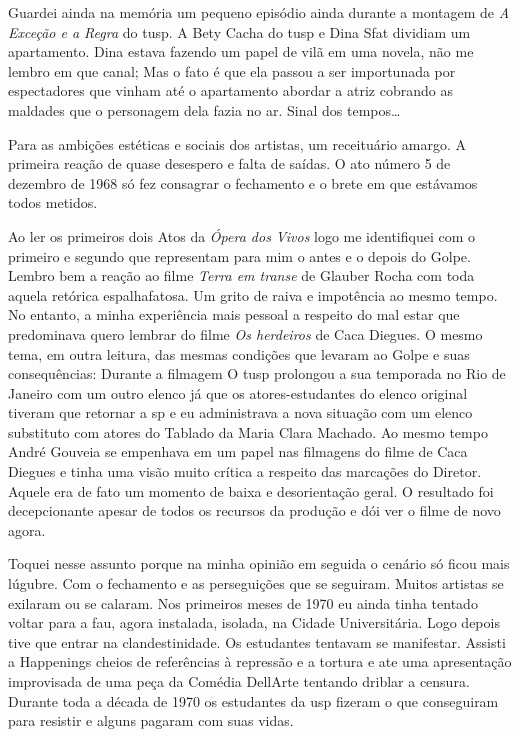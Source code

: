 Guardei ainda na memória um pequeno episódio ainda durante a montagem de
{\it A Exceção e a Regra} do {\sc tusp}. A Bety Cacha do {\sc tusp} e Dina Sfat
dividiam um apartamento. Dina estava fazendo um papel de vilã em uma
novela, não me lembro em que canal; Mas o fato é que ela passou a ser
importunada por espectadores que vinham até o apartamento abordar a
atriz cobrando as maldades que o personagem dela fazia no ar. Sinal dos
tempos\ldots{}

Para as ambições estéticas e sociais dos artistas, um receituário
amargo. A primeira reação de quase desespero e falta de saídas. O ato
número 5 de dezembro de 1968 só fez consagrar o fechamento e o brete em
que estávamos todos metidos.

Ao ler os primeiros dois Atos da {\it Ópera dos Vivos} logo me
identifiquei com o primeiro e segundo que representam para mim o antes e
o depois do Golpe. Lembro bem a reação ao filme {\it Terra em transe} de
Glauber Rocha com toda aquela retórica espalhafatosa. Um grito de raiva
e impotência ao mesmo tempo. No entanto, a minha experiência mais
pessoal a respeito do mal estar que predominava quero lembrar do filme
{\it Os herdeiros} de Caca Diegues. O mesmo tema, em outra leitura, das
mesmas condições que levaram ao Golpe e suas consequências: Durante a
filmagem O {\sc tusp} prolongou a sua temporada no Rio de Janeiro com um outro
elenco já que os atores-estudantes do elenco original tiveram que
retornar a {\sc sp} e eu administrava a nova situação com um elenco substituto
com atores do Tablado da Maria Clara Machado. Ao mesmo tempo André
Gouveia se empenhava em um papel nas filmagens do filme de Caca Diegues
e tinha uma visão muito crítica a respeito das marcações do Diretor.
Aquele era de fato um momento de baixa e desorientação geral. O
resultado foi decepcionante apesar de todos os recursos da produção e
dói ver o filme de novo agora.

Toquei nesse assunto porque na minha opinião em seguida o cenário só
ficou mais lúgubre. Com o fechamento e as perseguições que se seguiram.
Muitos artistas se exilaram ou se calaram. Nos primeiros meses de 1970
eu ainda tinha tentado voltar para a {\sc fau}, agora instalada, isolada, na
Cidade Universitária. Logo depois tive que entrar na clandestinidade. Os
estudantes tentavam se manifestar. Assisti a Happenings cheios de
referências à repressão e a tortura e ate uma apresentação improvisada
de uma peça da Comédia DellArte tentando driblar a censura. Durante toda
a década de 1970 os estudantes da {\sc usp} fizeram o que conseguiram para
resistir e alguns pagaram com suas vidas.

